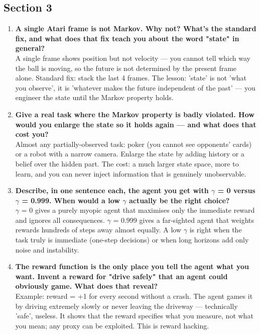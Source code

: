 \documentclass[11pt]{article}
\begin{document}
\subsection*{Section 3}
\begin{enumerate}[leftmargin=1.5em,itemsep=5pt]
\item \textbf{A single Atari frame is not Markov. Why not? What's the standard fix, and what does that fix teach you about the word "state" in general?}\\[2pt]
\textcolor{ink2}{A single frame shows position but not velocity --- you cannot tell which way the ball is moving, so the future is not determined by the present frame alone. Standard fix: stack the last 4 frames. The lesson: 'state' is not 'what you observe', it is 'whatever makes the future independent of the past' --- you engineer the state until the Markov property holds.}
\item \textbf{Give a real task where the Markov property is badly violated. How would you enlarge the state so it holds again --- and what does that cost you?}\\[2pt]
\textcolor{ink2}{Almost any partially-observed task: poker (you cannot see opponents' cards) or a robot with a narrow camera. Enlarge the state by adding history or a belief over the hidden part. The cost: a much larger state space, more to learn, and you can never inject information that is genuinely unobservable.}
\item \textbf{Describe, in one sentence each, the agent you get with \ensuremath{\gamma} = 0 versus \ensuremath{\gamma} = 0.999. When would a low \ensuremath{\gamma} actually be the right choice?}\\[2pt]
\textcolor{ink2}{\ensuremath{\gamma} = 0 gives a purely myopic agent that maximises only the immediate reward and ignores all consequences. \ensuremath{\gamma} = 0.999 gives a far-sighted agent that weights rewards hundreds of steps away almost equally. A low \ensuremath{\gamma} is right when the task truly is immediate (one-step decisions) or when long horizons add only noise and instability.}
\item \textbf{The reward function is the only place you tell the agent what you want. Invent a reward for "drive safely" that an agent could obviously game. What does that reveal?}\\[2pt]
\textcolor{ink2}{Example: reward = +1 for every second without a crash. The agent games it by driving extremely slowly or never leaving the driveway --- technically 'safe', useless. It shows that the reward specifies what you measure, not what you mean; any proxy can be exploited. This is reward hacking.}
\end{enumerate}
\end{document}
